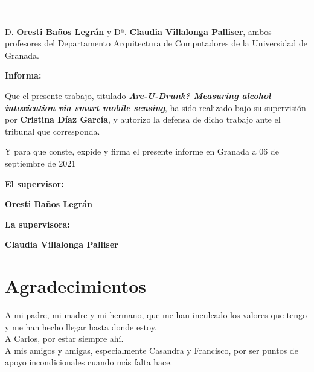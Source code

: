\noindent\rule[-1ex]{\textwidth}{2pt}\\[4.5ex]

D. \textbf{Oresti Baños Legrán} y Dª. \textbf{Claudia Villalonga Palliser}, ambos profesores del Departamento Arquitectura de Computadores de la Universidad de Granada.



\vspace{0.5cm}

\textbf{Informa:}

\vspace{0.5cm}

Que el presente trabajo, titulado \textit{\textbf{Are-U-Drunk? Measuring alcohol intoxication via smart mobile sensing}},
ha sido realizado bajo su supervisión por \textbf{Cristina Díaz García}, y autorizo la defensa de dicho trabajo ante el tribunal
que corresponda.

\vspace{0.5cm}

Y para que conste, expide y firma el presente informe en Granada a 06 de septiembre de 2021

\vspace{1cm}

\textbf{El supervisor:}

\vspace{5cm}
\begin{center}
\textbf{Oresti Baños Legrán}

\end{center}

\textbf{La supervisora:}

\vspace{5cm}
\begin{center}
\textbf{Claudia Villalonga Palliser}

\end{center}


\newpage

\section*{Agradecimientos}
\thispagestyle{empty}

\vspace{1cm}
\begin{flushleft}
A mi padre, mi madre y mi hermano, que me han inculcado los valores que tengo y me han hecho llegar hasta donde estoy.\\

A Carlos, por estar siempre ahí.\\

A mis amigos y amigas, especialmente Casandra y Francisco, por ser puntos de apoyo incondicionales cuando más falta hace.
\end{flushleft}
